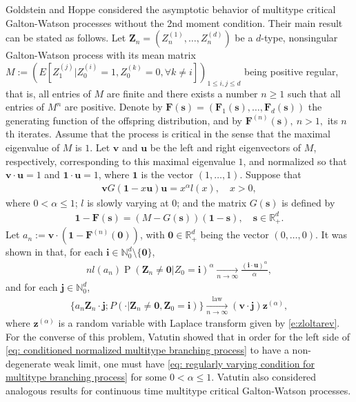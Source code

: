 \documentclass[12pt,a4paper]{amsart}
\theoremstyle{definition}
\numberwithin{equation}{section}
\begin{document}
Goldstein and Hoppe \cite{GoldsteinHoppe1978Critical} considered the asymptotic behavior of multitype critical Galton-Watson processes without the 2nd moment
condition. Their main result can be stated as follows.
  Let $\mathbf Z_n=(Z_n^{(1)}, \dots, Z_n^{(d)})$ be a $d$-type, nonsingular Galton-Watson process with its mean matrix $M:= (E[Z_1^{(j)}| Z_0^{(i)} = 1, Z_0^{(k)} = 0, \forall k \neq i])_{1\leq i,j\leq d}$ being positive regular, that is, all entries of $M$ are finite and there exists a number $n \geq 1$ such that all entries of $M^n$ are positive.
Denote by $\mathbf F(\mathbf s) = (\mathbf F_1(\mathbf s), \dots, \mathbf F_d(\mathbf s))$ the generating function of the offspring distribution, and by $\mathbf F^{(n)}(\mathbf s), ~ n>1,$ its $n$th iterates.
Assume that the process is critical in the sense that the maximal eigenvalue of $M$ is $1$.
Let $\mathbf v$ and $\mathbf u$ be the left and right  eigenvectors of $M$, respectively, corresponding to this maximal eigenvalue $1$, and normalized so that $\mathbf v \cdot \mathbf u = 1$ and $\mathbf 1 \cdot \mathbf u = 1$, where $\mathbf 1$ is the vector $(1,\dots, 1)$.
Suppose that
\begin{align}
  \label{eq: regularly varying condition for multitype branching process}
	\mathbf v G(\mathbf 1-x\mathbf u) \mathbf u
	= x^\alpha l(x),
	\quad x > 0,
\end{align}
where $0 < \alpha \leq 1$;
$l$ is slowly varying at $0$;
and the matrix $G(\mathbf s)$ is defined by
\begin{align}
	\mathbf 1 - \mathbf F(\mathbf s)
	= (M - G(\mathbf s))(\mathbf 1 - \mathbf s),
	\quad \mathbf s \in \mathbb R_+^d.
\end{align}
Let $a_n := \mathbf v \cdot (\mathbf 1 - \mathbf F^{(n)}(\mathbf 0))$, with $\mathbf 0 \in \mathbb R_+^d$ being the vector $(0,\dots, 0)$.
It was shown in \cite{GoldsteinHoppe1978Critical} that, for each $\mathbf i \in \mathbb N_0^d \setminus \{\mathbf 0\}$,
\begin{align}
  \label{eq: limit behavior of the exitinction probability without finite variance of multitype branching processes}
  n l(a_n)
	\operatorname{P}(\mathbf Z_n \neq \mathbf 0| Z_0 = \mathbf i)^\alpha
	\xrightarrow[n\to \infty]{}
	\frac{(\mathbf i \cdot \mathbf u)^\alpha}\alpha,
\end{align}
and for each $\mathbf j \in \mathbb N_0^d$,
\begin{align}\label{eq: conditioned normalized multitype branching process}
	\{ a_n \mathbf Z_n \cdot \mathbf j ; P(\cdot | \mathbf Z_n \neq \mathbf 0, \mathbf Z_0 = \mathbf i)\}
	\xrightarrow[n\to \infty]{\operatorname{law}} (\mathbf v\cdot \mathbf j) \mathbf z^{(\alpha)},
\end{align}
where $\mathbf z^{(\alpha)}$ is a random variable with Laplace transform given by \eqref{e:zloltarev}.
For the converse of this problem, Vatutin \cite{Vatutin1977Limit} showed that in order for the left side of \eqref{eq: conditioned normalized multitype branching process} to have a non-degenerate weak limit, one must have \eqref{eq: regularly varying condition for multitype branching process} for some $0 < \alpha \leq 1$.
Vatutin \cite{Vatutin1977Limit} also considered analogous results for continuous time multitype critical Galton-Watson processes.
	
\end{document}
